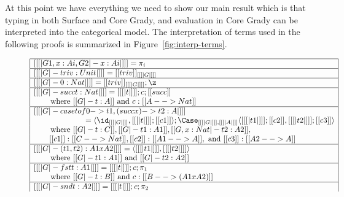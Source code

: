 At this point we have everything we need to show our main result which
is that typing in both Surface and Core Grady, and evaluation in Core
Grady can be interpreted into the categorical model.  The
interpretation of terms used in the following proofs is summarized in
Figure~\ref{fig:interp-terms}.
\begin{figure}
  \small  
    \begin{center}
      \begin{math}
          \begin{array}{|l|}
            \hline
            [[ [| G1 , x : Ai , G2 |- x : Ai |] ]] = \pi_i\\
            \hline
            [[ [| G |- triv : Unit |] ]] = [[triv]]_{[[ [| G |] ]]}\\
            \hline
            [[ [| G |- 0 : Nat |] ]] = [[triv]]_{[[ [| G |] ]]};\z\\
            \hline
            [[ [| G |- succ t : Nat |] ]] = [[ [| t |] ]];c;[[succ]]\\
            \,\,\,\,\,\,\,\,\,\,\,\text{ where } [[G |- t : A]]\text{ and }c : [[A --> Nat]]\\
            \hline
            [[ [| G |- case t of 0 -> t1, (succ x) -> t2 : A |] ]]\\
            \,\,\,\,\,\,\,\,\,\,\,\,\,\,\,\,\,\,\,\,\,\,\,\,\,\,\,\,\,\,\,\,\,\,\,\,\,\,\,\,           
     = \langle \id_{[[ [| G |] ]]}, [[ [| t |] ]];[[c1]] \rangle;\Case_{[[ [| G |] ]], [[ [| A |] ]]}\langle [[ [|t1|] ]];[[c2]], [[ [| t2 |] ]];[[c3]] \rangle\\
     \,\,\,\,\,\,\,\,\,\,\,\text{ where } [[G |- t : C]], [[G |- t1 : A1]], [[G, x : Nat |- t2 : A2]],\\
     \,\,\,\,\,\,\,\,\,\,\,\,[[c1]] : [[C --> Nat]], [[c2]] : [[A1 --> A]], \text{ and } [[c3]] : [[A2 --> A]]\\
            \hline
            [[ [| G |- (t1,t2) : A1 x A2 |] ]] = \langle [[ [| t1 |] ]] , [[ [| t2 |] ]] \rangle\\
            \,\,\,\,\,\,\,\,\,\,\,\text{ where } [[G |- t1 : A1]]\text{ and } [[G |- t2 : A2]]\\
            \hline
            [[ [| G |- fst t : A1 |] ]] = [[ [| t |] ]];c;\pi_1\\
            \,\,\,\,\,\,\,\,\,\,\,\text{ where } [[G |- t : B]]\text{ and }c : [[B --> (A1 x A2)]]\\
            \hline
            [[ [| G |- snd t : A2 |] ]] = [[ [| t |] ]];c;\pi_2\\           

\end{array}
\end{math}
\end{center}
\end{figure}
